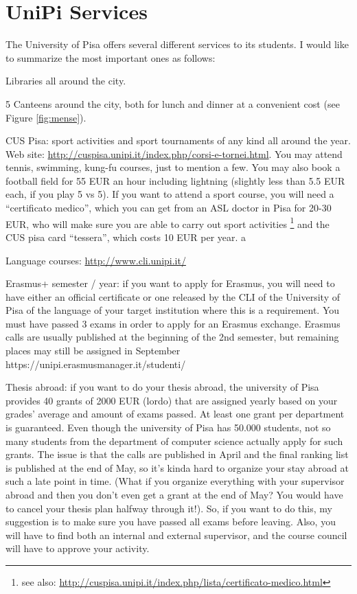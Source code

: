 \documentclass[11pt,fleqn,oneside]{book} %
\begin{document}
\section{UniPi Services}
The University of Pisa offers several different services to its students. I would like to summarize the most important ones as follows:
\item Libraries all around the city.
\item 5 Canteens around the city, both for lunch and dinner at a convenient cost (see Figure \ref{fig:mense}).
\item CUS Pisa: sport activities and sport tournaments of any kind all around the year. Web site: \url{http://cuspisa.unipi.it/index.php/corsi-e-tornei.html}. You may attend tennis, swimming, kung-fu courses, just to mention a few. You may also book a football field for 55 EUR an hour including lightning (slightly less than 5.5 EUR each, if you play 5 vs 5).
If you want to attend a sport course, you will need a “certificato medico”, which you can get from an ASL doctor in Pisa for 20-30 EUR, who will make sure you are able to carry out sport activities \footnote{see also: \url{http://cuspisa.unipi.it/index.php/lista/certificato-medico.html}} and the CUS pisa card “tessera”, which costs 10 EUR per year. a
\item Language courses:  \url{http://www.cli.unipi.it/}
\item Erasmus+ semester / year: if you want to apply for Erasmus, you will need to have either an official certificate or one released by the CLI of the University of Pisa of the language of your target institution where this is a requirement. You must have passed 3 exams in order to apply for an Erasmus exchange. Erasmus calls are usually published at the beginning of the 2nd semester, but remaining places may still be assigned in September https://unipi.erasmusmanager.it/studenti/
\item Thesis abroad: if you want to do your thesis abroad, the university of Pisa provides 40 grants of 2000 EUR (lordo) that are assigned yearly based on your grades’ average and amount of exams passed. At least one grant per department is guaranteed. Even though the university of Pisa has 50.000 students, not so many students from the department of computer science actually apply for such grants. The issue is that the calls are published in April and the final ranking list is published at the end of May, so it’s kinda hard to organize your stay abroad at such a late point in time. (What if you organize everything with your supervisor abroad and then you don’t even get a grant at the end of May? You would have to cancel your thesis plan halfway through it!). So, if you want to do this, my suggestion is to make sure you have passed all exams before leaving.  Also, you will have to find both an internal and external supervisor, and the course council will have to approve your activity. 
\end{document}
